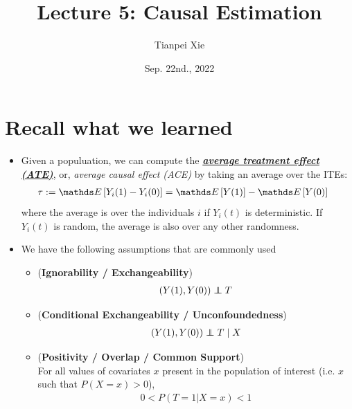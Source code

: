 \documentclass[11pt]{article}
\begin{document}
\title{Lecture 5: Causal Estimation}
\author{ Tianpei Xie}
\date{Sep. 22nd., 2022 }
\maketitle
\tableofcontents
\newpage
\allowdisplaybreaks
\section{Recall what we learned}
\begin{itemize}
\item Given a populuation, we can compute the \underline{\emph{\textbf{average treatment effect (ATE)}}}, or, \emph{average causal effect (ACE)} \citep{imbens2015causal,  rosenbaum2017observation,  neal2020introduction}  by taking an average over the ITEs:
\begin{align}
\tau &:=  \E{}{Y_i(1) - Y_i(0)} =  \E{}{Y(1)} -\E{}{Y(0)} \label{eqn: ATE}
\end{align} where the average is over the individuals $i$ if $Y_i(t)$ is deterministic. If $Y_i(t)$ is random, the average is also over any other randomness.

\item We have the following assumptions that are commonly used
\begin{itemize}
\item \begin{assumption} (\textbf{Ignorability / Exchangeability}) \citep{neal2020introduction}
\begin{align}
(Y(1), Y(0)) \indep T  \label{eqn: Ignorability}
\end{align}
\end{assumption}

\item \begin{assumption} (\textbf{Conditional Exchangeability / Unconfoundedness}) \citep{neal2020introduction}
\begin{align}
(Y(1), Y(0)) \indep T \;|\; X \label{eqn: conditional_exchangeablity}
\end{align} 
\end{assumption}

\item \begin{assumption} (\textbf{Positivity / Overlap / Common Support})  \citep{neal2020introduction}\\
For all values of covariates $x$ present in the population of interest (i.e. $x$ such that $P(X = x) > 0$),
\begin{align}
0 < P(T=1 | X = x) < 1 \label{eqn: positive}
\end{align}
\end{assumption} 


\end{itemize}
\end{itemize}
\end{document}
